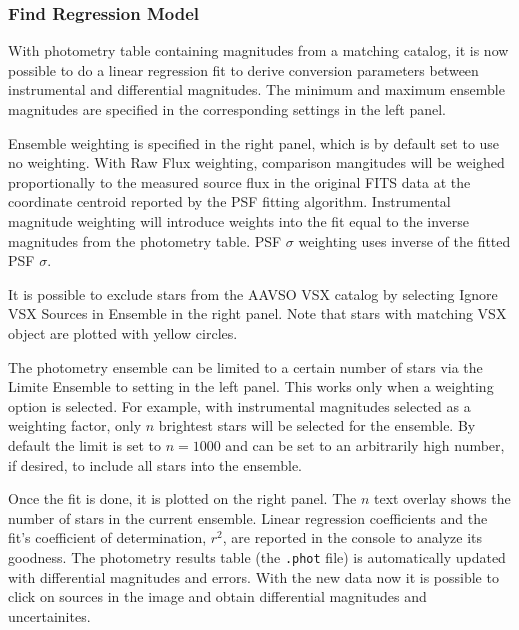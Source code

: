 \documentclass{article}
\begin{document}
\subsubsection{Find Regression Model}
With photometry table containing magnitudes from a matching catalog, it is now possible to do a linear regression fit to derive conversion parameters between instrumental and differential magnitudes. The minimum and maximum ensemble magnitudes are specified in the corresponding settings in the left panel. 

Ensemble weighting is specified in the right panel, which is by default set to use no weighting. With Raw Flux weighting, comparison mangitudes will be weighed proportionally to the measured source flux in the original FITS data at the coordinate centroid reported by the PSF fitting algorithm. Instrumental magnitude weighting will introduce weights into the fit equal to the inverse magnitudes from the photometry table. PSF $\sigma$ weighting uses inverse of the fitted PSF $\sigma$. 

It is possible to exclude stars from the AAVSO VSX catalog by selecting Ignore VSX Sources in Ensemble in the right panel. Note that stars with matching VSX object are plotted with yellow circles. 

The photometry ensemble can be limited to a certain number of stars via the Limite Ensemble to setting in the left panel. This works only when a weighting option is selected. For example, with instrumental magnitudes selected as a weighting factor, only $n$ brightest stars will be selected for the ensemble. By default the limit is set to $n=1000$ and can be set to an arbitrarily high number, if desired, to include all stars into the ensemble. 

Once the fit is done, it is plotted on the right panel. The $n$ text overlay shows the number of stars in the current ensemble. Linear regression coefficients and the fit's coefficient of determination, $r^2$, are reported in the console to analyze its goodness. The photometry results table (the \texttt{.phot} file) is automatically updated with differential magnitudes and errors. With the new data now it is possible to click on sources in the image and obtain differential magnitudes and uncertainites. 
\end{document}
